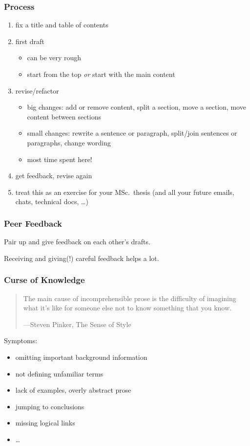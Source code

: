 \begin{frame}
  \frametitle{Process}

  \begin{enumerate}[<+->]
    \item fix a title and table of contents
    \item first draft
          \begin{itemize}
            \item can be very rough
            \item start from the top \emph{or} start with the main content
          \end{itemize}
    \item revise/refactor
          \begin{itemize}
            \item big changes: add or remove content, split a section, move a section, move content between sections
            \item small changes: rewrite a sentence or paragraph, split/join sentences or paragraphs, change wording
            \item most time spent here!
          \end{itemize}
    \item get feedback, revise again
    \item treat this as an exercise for your MSc.\ thesis (and all your future emails, chats, technical docs, \dots)
  \end{enumerate}
\end{frame}

\begin{frame}
  \frametitle{Peer Feedback}

  Pair up and give feedback on each other's drafts.

  \medskip
  \pause

  Receiving and giving(!) careful feedback helps a lot.
\end{frame}

\begin{frame}
  \frametitle{Curse of Knowledge}

  \begin{quote}
    The main cause of incomprehensible prose is the difficulty of imagining what it's like for someone else not to know something that you know.

    ---Steven Pinker, The Sense of Style
  \end{quote}

  \pause
  \medskip

  Symptoms:
  \begin{itemize}[<+->]
    \item omitting important background information
    \item not defining unfamiliar terms
    \item lack of examples, overly abstract prose
    \item jumping to conclusions
    \item missing logical links
    \item \dots
  \end{itemize}
\end{frame}

